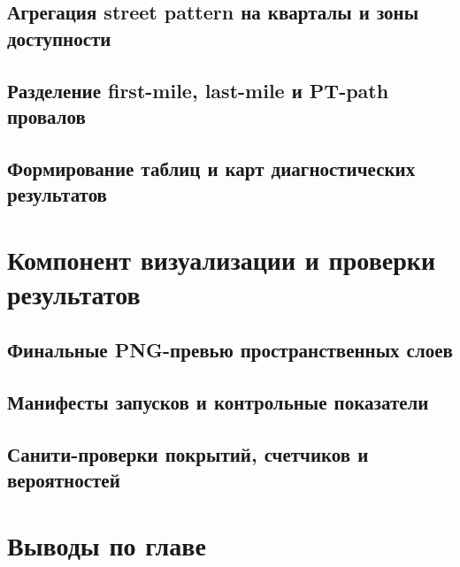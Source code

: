 \subsection{Агрегация street pattern на кварталы и зоны доступности}
\label{subsec:street-pattern-aggregation}

\subsection{Разделение first-mile, last-mile и PT-path провалов}
\label{subsec:failure-component-split}

\subsection{Формирование таблиц и карт диагностических результатов}
\label{subsec:diagnostic-outputs}

\section{Компонент визуализации и проверки результатов}
\label{sec:visualization-verification-component}

\subsection{Финальные PNG-превью пространственных слоев}
\label{subsec:png-previews}

\subsection{Манифесты запусков и контрольные показатели}
\label{subsec:run-manifests}

\subsection{Санити-проверки покрытий, счетчиков и вероятностей}
\label{subsec:sanity-checks}

\section{Выводы по главе}
\label{sec:chapter3-conclusions}
